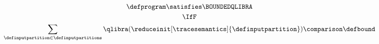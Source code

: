 \begin{gather*}
  \defprogram \satisfies \BOUNDEDQLIBRA \\ \IfF \\
  \sum_{\definputpartition\in\definputpartitions} \qlibra(
    \reduceinit[\tracesemantics]{\definputpartition}
  ) \comparison \defbound
\end{gather*}
